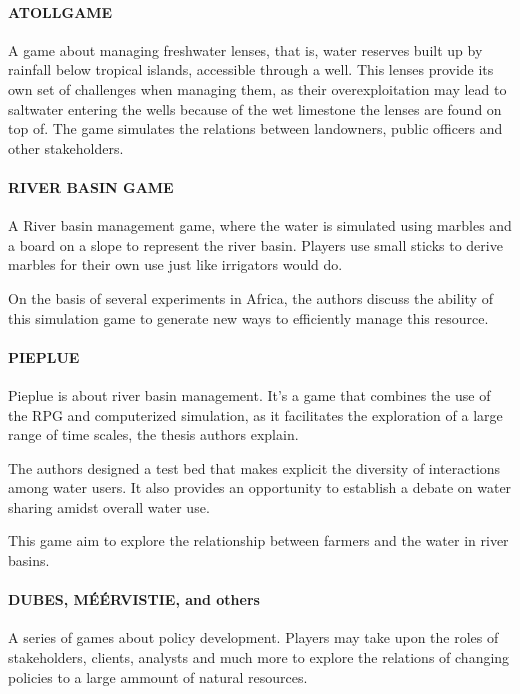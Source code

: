 \paragraph{ATOLLGAME
\cite{Dray2006}}
A game about managing freshwater lenses, that is, water reserves built up
by rainfall below tropical islands, accessible through a well. This
lenses provide its own set of challenges when managing them, as their
overexploitation may lead to saltwater entering the wells because of the
wet limestone the lenses are found on top of. The game simulates the relations
between landowners, public officers and other stakeholders.

\paragraph{RIVER BASIN GAME
\cite{Lankford2004}}
A River basin management game, where the water is simulated using marbles
and a board on a slope to represent the river basin.
Players use small sticks to derive marbles for their own use just like
irrigators would do.

On the basis of several experiments in Africa, the authors discuss the ability
of this simulation game to generate new ways to efficiently manage this
resource.

\paragraph{PIEPLUE
\cite{Barreteau2007}}
Pieplue is about river basin management. It's a game that combines the use
of the \gls{RPG} and computerized simulation, as it facilitates the
exploration of a large range of time scales, the thesis authors explain.

The authors designed a test bed that
makes explicit the diversity of interactions among water users.
It also provides an
opportunity to establish a debate on water sharing amidst overall water use.

This game aim to explore the relationship between farmers and the water in
river basins.

\paragraph{DUBES, MÉÉRVISTIE, and others
\cite{Bots2007}}
A series of games about policy development. Players may take upon the
roles of stakeholders, clients, analysts and much more to explore the relations
of changing policies to a large ammount of natural resources.

